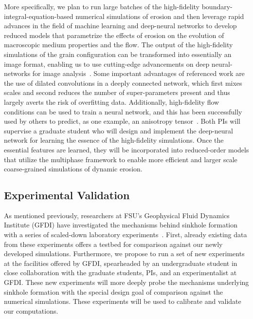 \documentclass[11pt]{article}
\begin{document}
More specifically, we plan to run large batches of the high-fidelity boundary-integral-equation-based numerical simulations of erosion and then leverage rapid advances in the field of machine learning and deep-neural networks \cite{ling2016reynolds, kutz2017deep, ling2016machine, pelt2018mixed} to develop reduced models that parametrize the effects of erosion on the evolution of macroscopic medium properties and the flow.  The output of the high-fidelity simulations of the grain configuration can be transformed into essentially an image format, enabling us to use cutting-edge advancements on deep neural-networks for image analysis~\cite{pelt2018mixed}. Some important advantages of referenced work are the use of dilated convolutions in a deeply connected network, which first mixes scales and second reduces the number of super-parameters present and thus largely averts the risk of overfitting data. Additionally, high-fidelity flow conditions can be used to train a neural network, and this has been successfully used by others to predict, as one example, an anisotropy tensor~\cite{ling2016reynolds}.  Both PIs will supervise a graduate student who will design and implement the deep-neural network for learning the essence of the high-fidelity simulations. Once the essential features are learned, they will be incorporated into reduced-order models that utilize the multiphase framework to enable more efficient and larger scale coarse-grained simulations of dynamic erosion.

\subsection{Experimental Validation}
\label{sec:experiments}
As mentioned previously, researchers at FSU's Geophysical Fluid Dynamics Institute (GFDI) have investigated the mechanisms behind sinkhole formation with a series of scaled-down laboratory experiments~\cite{tao2014experimental}. First, already existing data from these experiments offers a testbed for comparison against our newly developed simulations. Furthermore, we propose to run a set of new experiments at the facilities offered by GFDI, spearheaded by an undergraduate student in close collaboration with the graduate students, PIs, and an experimentalist at GFDI. These new experiments will more deeply probe the mechanisms underlying sinkhole formation with the special design goal of comparison against the numerical simulations. These experiments will be used to calibrate and validate our computations.
\end{document}
